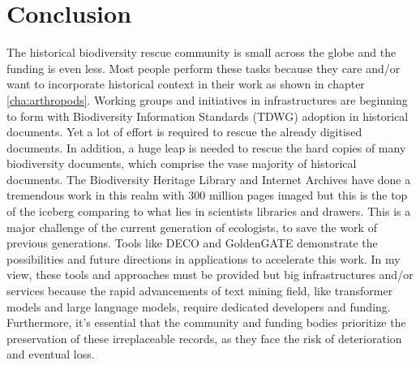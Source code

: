 \section{Conclusion}

The historical biodiversity rescue community is small across the globe and the funding 
is even less. Most people perform these tasks because they care and/or want to
incorporate historical context in their work as shown in chapter \ref{cha:arthropods}. 
Working groups and initiatives in infrastructures are beginning to 
form with Biodiversity Information Standards (TDWG) adoption in historical documents.
Yet a lot of effort is required to rescue the already digitised documents.
In addition, a huge leap is needed to rescue the hard copies of many 
biodiversity documents, which comprise the vase majority of historical 
documents. The Biodiversity Heritage Library and Internet Archives 
have done a tremendous work in this realm with 300 million pages 
imaged but this is the top of the iceberg comparing to what lies in 
scientists libraries and drawers. This is a major challenge of the current 
generation of ecologists, to save the work of previous generations. 
Tools like DECO and GoldenGATE demonstrate the possibilities 
and future directions in applications to accelerate this work.
In my view, these tools and approaches must be provided but big 
infrastructures and/or services because the rapid advancements of 
text mining field, like transformer models and large language models, require 
dedicated developers and funding.
Furthermore, it's essential that the community and funding bodies prioritize the preservation of these irreplaceable records, as they face the risk of deterioration and eventual loss.
